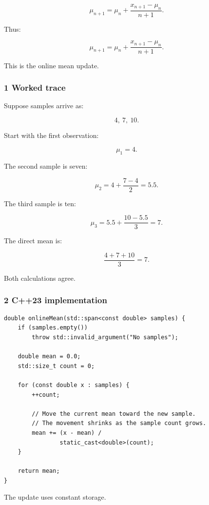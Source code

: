 \[
 \mu_{n+1} = \mu_n+ \frac{x_{n+1}-\mu_n}{n+1}.
\]

Thus:

\[
 \boxed{ \mu_{n+1} = \mu_n+ \frac{x_{n+1}-\mu_n}{n+1} }.
\]

This is the online mean update.

\subsubsection{1 Worked trace}\label{02-foundations-ii-ch030-worked-trace}

\hypertarget{02-foundations-ii-ch030-worked-trace}{}

Suppose samples arrive as:

\[
 4,\ 7,\ 10.
\]

Start with the first observation:

\[
 \mu_1=4.
\]

The second sample is seven:

\[
 \mu_2 = 4+\frac{7-4}{2} =5.5.
\]

The third sample is ten:

\[
 \mu_3 = 5.5+\frac{10-5.5}{3} =7.
\]

The direct mean is:

\[
 \frac{4+7+10}{3}=7.
\]

Both calculations agree.

\subsubsection{2 C++23 implementation}\label{02-foundations-ii-ch030-c23-implementation}

\hypertarget{02-foundations-ii-ch030-c23-implementation}{}

\begin{verbatim}
double onlineMean(std::span<const double> samples) {
    if (samples.empty())
        throw std::invalid_argument("No samples");

    double mean = 0.0;
    std::size_t count = 0;

    for (const double x : samples) {
        ++count;

        // Move the current mean toward the new sample.
        // The movement shrinks as the sample count grows.
        mean += (x - mean) /
                static_cast<double>(count);
    }

    return mean;
}
\end{verbatim}

The update uses constant storage.

